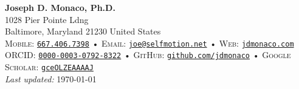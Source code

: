 \begin{center}
  \textbf{\LARGE\color{hopkinsblue} Joseph D. Monaco, Ph.D.} \\[0.1in]
  1028 Pier Pointe Ldng \\
  Baltimore, Maryland 21230 United States \\[2mm]
  \small
  \textsc{Mobile:} \href{tel:16674067398}{\color{hopkinsblue}\texttt{667.406.7398}} •
  \textsc{Email:} \href{mailto:joe@selfmotion.net}{\color{hopkinsblue}\texttt{joe@selfmotion.net}} • 
  \textsc{Web:} \href{https://jdmonaco.com/}{\color{hopkinsblue}\texttt{jdmonaco.com}} \\  
  \textsc{ORCID:} \href{https://jdmonaco.com/orcid}{\color{hopkinsblue}\texttt{0000-0003-0792-8322}} • 
  \textsc{GitHub:} \href{https://jdmonaco.com/github}{\color{hopkinsblue}\texttt{github.com/jdmonaco}} • 
  \textsc{Google Scholar:} \href{https://jdmonaco.com/google-scholar}{\color{hopkinsblue}\texttt{gceOLZEAAAAJ}} \\
  {\tiny \emph{Last updated:} \today}
\end{center}



